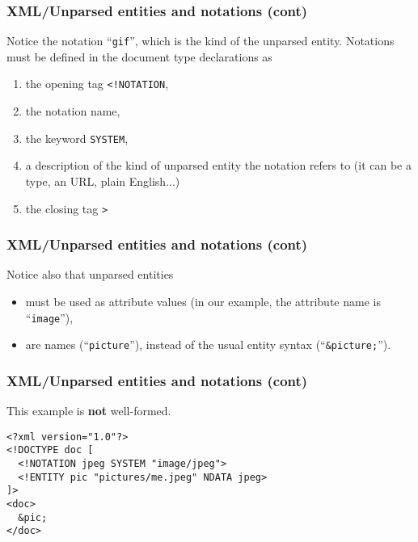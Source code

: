 %
\begin{frame}[containsverbatim]
\frametitle{XML/Unparsed entities and notations (cont)}

Notice the notation ``\texttt{gif}'', which is the kind of the
unparsed entity. Notations must be defined in the document type
declarations as
\begin{enumerate}

  \item the opening tag \verb|<!NOTATION|,

  \item the notation name,

  \item the keyword \verb|SYSTEM|,

  \item a description of the kind of unparsed entity the notation
    refers to (it can be a \MIME type, an URL, plain English...)

  \item the closing tag \verb|>|

\end{enumerate}

\end{frame}

%
\begin{frame}
\frametitle{XML/Unparsed entities and notations (cont)}

Notice also that unparsed entities
\begin{itemize}

  \item must be used as attribute values (in our example, the
    attribute name is ``\texttt{image}''),

  \item are names (``\texttt{picture}''), instead of the usual entity
    syntax (``\texttt{\&picture;}'').

\end{itemize}

\end{frame}

%
\begin{frame}[containsverbatim]
\frametitle{XML/Unparsed entities and notations (cont)}

This example is \textbf{not} well-formed.
\begin{verbatim}
<?xml version="1.0"?>
<!DOCTYPE doc [
  <!NOTATION jpeg SYSTEM "image/jpeg">
  <!ENTITY pic "pictures/me.jpeg" NDATA jpeg>
]>
<doc>
  &pic;
</doc>
\end{verbatim}

\end{frame}


